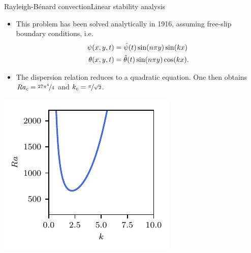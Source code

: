 \documentclass[usenames,dvipsnames,svgnames,10pt,aspectratio=169]{beamer}
\begin{document}
\begin{frame}[t, c]{Rayleigh-Bénard convection}{Linear stability analysis}
	\begin{minipage}{.64\textwidth}
		\begin{itemize}
			\item This problem has been solved analytically in 1916, assuming free-slip boundary conditions, i.e.\
			\begin{equation}
				\begin{aligned}
					\psi(x, y, t) & = \hat{\psi}(t) \sin (n \pi y) \sin(kx)\\
					\theta(x, y, t) & = \hat{\theta}(t) \sin (n \pi y) \cos(kx).
				\end{aligned}
				\notag
			\end{equation}

			\bigskip

			\item The dispersion relation reduces to a quadratic equation. One then obtains $Ra_c = \nicefrac{27 \pi^4}{4}$ and $k_c = \nicefrac{\pi}{\sqrt{2}}$.
		\end{itemize}
	\end{minipage}%
	\hfill
	\begin{minipage}{.32\textwidth}
		\centering
		\includegraphics[width=.9\textwidth]{rayleigh_benard_dispersion_relation}
	\end{minipage}

	\vspace{1cm}
\end{frame}
\end{document}
